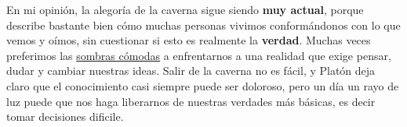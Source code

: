 \documentclass{article}
\begin{document}
En mi opinión, la alegoría de la caverna sigue siendo \textbf{muy actual}, porque describe bastante bien cómo muchas personas vivimos conformándonos con lo que vemos y oímos, sin cuestionar si esto es realmente la \textbf{verdad}. Muchas veces preferimos las \underline{sombras cómodas} a enfrentarnos a una realidad que exige pensar, dudar y cambiar nuestras ideas. Salir de la caverna no es fácil, y Platón deja claro que el conocimiento casi siempre puede ser doloroso, pero un día un rayo de luz puede que nos haga liberarnos de nuestras verdades más básicas, es decir tomar decisiones dificile. 
\end{document}

